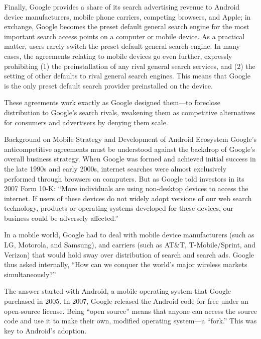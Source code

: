 \documentclass[11pt,b5paper]{scrartcl}
\begin{document}

Finally, Google provides a share of its search advertising revenue to Android
device manufacturers, mobile phone carriers, competing browsers, and Apple; in exchange,
Google becomes the preset default general search engine for the most important search access
points on a computer or mobile device. As a practical matter, users rarely switch the preset
default general search engine. In many cases, the agreements relating to mobile devices go even
further, expressly prohibiting (1) the preinstallation of any rival general search services, and (2)
the setting of other defaults to rival general search engines. This means that Google is the only
preset default search provider preinstalled on the device.


These agreements work exactly as Google designed them—to foreclose
distribution to Google’s search rivals, weakening them as competitive alternatives for consumers
and advertisers by denying them scale.




Background on Mobile Strategy and Development of Android Ecosystem
Google’s anticompetitive agreements must be understood against the backdrop of
Google’s overall business strategy. When Google was formed and achieved initial success in the
late 1990s and early 2000s, internet searches were almost exclusively performed through
browsers on computers. But as Google told investors in its 2007 Form 10-K: “More individuals
are using non-desktop devices to access the internet. If users of these devices do not widely
adopt versions of our web search technology, products or operating systems developed for these
devices, our business could be adversely affected.”


In a mobile world, Google had to deal with mobile device manufacturers (such as
LG, Motorola, and Samsung), and carriers (such as AT\&T, T-Mobile/Sprint, and Verizon) that
would hold sway over distribution of search and search ads. Google thus asked internally, “How
can we conquer the world’s major wireless markets simultaneously?”


The answer started with Android, a mobile operating system that Google
purchased in 2005. In 2007, Google released the Android code for free under an open-source
license. Being “open source” means that anyone can access the source code and use it to make
their own, modified operating system—a “fork.” This was key to Android’s adoption.
\end{document}
